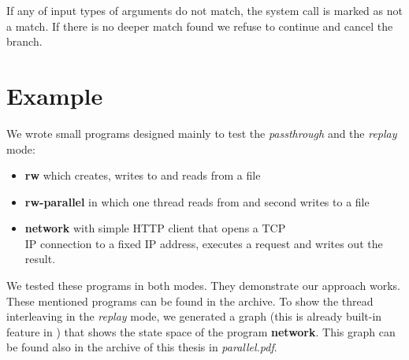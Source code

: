 If any of input types of arguments do not match, the system call is marked as not a match. If there is no deeper match found we refuse to continue and cancel the branch.


\section{Example}

We wrote small programs designed mainly to test the \textit{passthrough} and the \textit{replay} mode:
 \begin{itemize}
\item \textbf{rw} which creates, writes to and reads from a file 
\item \textbf{rw-parallel} in which one thread reads from and second writes to a file
\item \textbf{network} with simple HTTP client that opens a TCP\\IP connection to a fixed IP address, executes a request and writes out the result.
\end{itemize} 

We tested these programs in both modes. They demonstrate our approach works. These mentioned programs can be found in the archive. To show the thread interleaving in the \textit{replay} mode, we generated a graph (this is already built-in feature in \divine) that shows the state space of the program \textbf{network}. This graph can be found also in the archive of this thesis in \textit{parallel.pdf}.